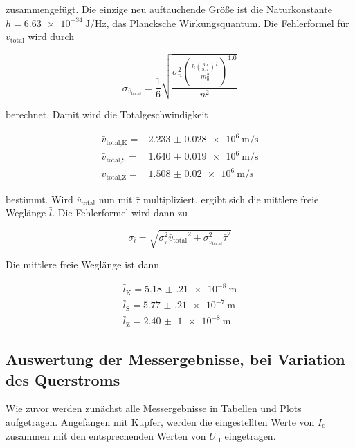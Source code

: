 zusammengefügt.
Die einzige neu auftauchende Größe ist die Naturkonstante $h = \SI{6.63e-34}{\joule\per\hertz}$, das Plancksche Wirkungsquantum.\cite{physics_constants}
Die Fehlerformel für $\bar{v}_\text{total}$ wird durch 

\begin{equation}
    \sigma _{\bar{v}_\text{total}} = \frac{1}{6}  \sqrt{\frac{\sigma_{n}^{2} \left(\frac{h \left(\frac{3 n}{8 \Pi}\right)^{\frac{1}{6}}}{m_{0}^{2}}\right)^{1.0}}{n^{2}}}
    \label{eq:totalgeschw._fehler}
\end{equation}

berechnet.
Damit wird die Totalgeschwindigkeit

\begin{align*}
    \bar{v}_\text{total,K} =& \SI{2.233(28)e6}{\meter\per\second}\\
    \bar{v}_\text{total,S} =& \SI{1.640(19)e6}{\meter\per\second}\\
    \bar{v}_\text{total,Z} =& \SI{1.508(20)e6}{\meter\per\second}
\end{align*}

bestimmt.
Wird $\bar{v}_\text{total}$ nun mit $\bar{\tau}$ multipliziert, ergibt sich die mittlere freie Weglänge $\bar{l}$.
Die Fehlerformel wird dann zu

\begin{equation}
    \sigma _{\bar{l}} = \sqrt{\sigma_{\bar{\tau}}^{2} {\bar{v}_\text{total}}^{2} + \sigma_{\bar{v}_\text{total}}^{2} {\bar{\tau}}^{2}}
    \label{eq:weglaenge_fehler}
\end{equation}

Die mittlere freie Weglänge ist dann

\begin{align*}
    \bar{l}_\text{K} = \SI{5.18(21)e-8}{\meter}\\
    \bar{l}_\text{S} = \SI{5.77(21)e-7}{\meter}\\
    \bar{l}_\text{Z} = \SI{2.40(10)e-8}{\meter}
\end{align*}

\subsection{Auswertung der Messergebnisse, bei Variation des Querstroms}
\label{ssec:mess2}

Wie zuvor werden zunächst alle Messergebnisse in Tabellen und Plots aufgetragen.
Angefangen mit Kupfer, werden die eingestellten Werte von $I_\text{q}$ zusammen mit den entsprechenden Werten von $U_\text{H}$ eingetragen.

